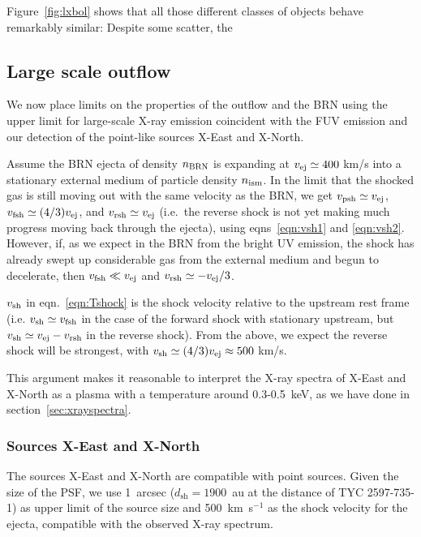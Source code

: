 \documentclass[]{aastex631}
\begin{document}
Figure~\ref{fig:lxbol} shows that all those different classes of objects behave remarkably similar: Despite some scatter, the 



\subsection{Large scale outflow}
\label{sec:outflow}
We now place limits on the properties of the outflow and the BRN using the upper limit for large-scale X-ray emission coincident with the FUV emission and our detection of the point-like sources X-East and X-North.

Assume the BRN ejecta of density $n_{\rm BRN}$ is expanding at $v_{\rm ej} \simeq 400$ km/s into a stationary external medium of particle density $n_{\rm ism}$.  In the limit that the shocked gas is still moving out with the same velocity as the BRN, we get  $v_{\rm psh} \simeq v_{\rm ej}$, $v_{\rm fsh} \simeq (4/3)v_{\rm ej}$, and $v_{\rm rsh} \simeq v_{\rm ej}$ (i.e.\ the reverse shock is not yet making much progress moving back through the ejecta), using eqns~\ref{eqn:vsh1} and \ref{eqn:vsh2}.  However, if, as we expect in the BRN from the bright UV emission, the shock has already swept up considerable gas from the external medium and begun to decelerate, then $v_{\rm fsh} \ll v_{\rm ej}$ and $v_{\rm rsh} \simeq -v_{\rm ej}/3$.

$v_{\rm sh}$ in eqn.~\ref{eqn:Tshock} is the shock velocity relative to the upstream rest frame (i.e. $v_{\rm sh} \simeq v_{\rm fsh}$ in the case of the forward shock with stationary upstream, but $v_{\rm sh} \simeq v_{\rm ej}-v_{\rm rsh}$ in the reverse shock).  From the above, we expect the reverse shock will be strongest, with $v_{\rm sh} \simeq (4/3)v_{\rm ej} \approx 500$ km/s.

This argument makes it reasonable to interpret the X-ray spectra of X-East and X-North as a plasma with a temperature around 0.3-0.5~keV, as we have done in section~\ref{sec:xrayspectra}.

\subsubsection{Sources X-East and X-North}
The sources X-East and X-North are compatible with point sources. Given the size of the PSF, we use 1~arcsec ($d_\mathrm{sh}=1900$~au at the distance of TYC 2597-735-1) as upper limit of the source size and 500~km~s$^{-1}$ as the shock velocity for the ejecta, compatible with the observed X-ray spectrum.
\end{document}

